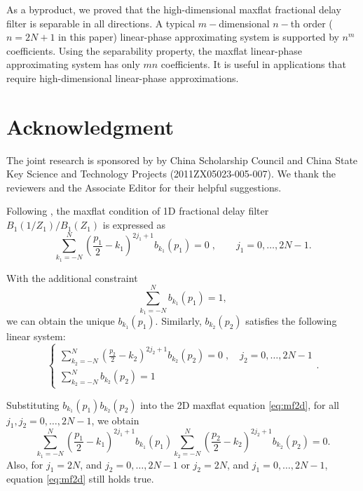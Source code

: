 As a byproduct, 
we proved that the high-dimensional maxflat fractional delay filter 
is separable in all directions.
A typical $m-$dimensional $n-$th order 
($n=2N+1$ in this paper) linear-phase 
approximating system is supported by $n^m$ coefficients.
Using the separability property,
the maxflat linear-phase
approximating system has only $mn$ coefficients.
It is useful in applications that require 
high-dimensional linear-phase approximations.

\section*{Acknowledgment}
The joint research is sponsored by by China Scholarship Council and
China State Key Science and Technology Projects (2011ZX05023-005-007).
We thank the reviewers and the Associate Editor for
their helpful suggestions.


Following \cite{thiran1971recursive}, 
the maxflat condition of 1D fractional delay
filter $B_1(1/Z_1)/B_1(Z_1)$ is expressed as
\begin{equation}
\sum_{k_1=-N}^N(\frac{p_1}{2}-k_1)^{2j_1+1}b_{k_1}(p_1)=0\;,
\qquad j_1=0,\dots,2N-1.
\end{equation}

With the additional constraint \cite[]{chen:2012a}
\begin{equation}
\sum_{k_1=-N}^Nb_{k_1}(p_1)=1,
\end{equation}
we can obtain the unique $b_{k_1}(p_1)$.
Similarly, $b_{k_2}(p_2)$ satisfies 
the following linear system:
\begin{equation}
\left\{\begin{array}{l}
\displaystyle{\sum_{k_2=-N}^N(\frac{p_2}{2}-k_2)^{2j_2+1}b_{k_2}(p_2)=0}\;,
 \quad j_2=0,\dots,2N-1 \\
\displaystyle{\sum_{k_2=-N}^Nb_{k_2}(p_2)=1}
\end{array}\right..
\end{equation}

Substituting $b_{k_1}(p_1)b_{k_2}(p_2)$ into 
the 2D maxflat equation \ref{eq:mf2d}, for all
$j_1,j_2=0,\dots,2N-1$, we obtain
\begin{equation}
\sum_{k_1=-N}^N(\frac{p_1}{2}-k_1)^{2j_1+1}b_{k_1}(p_1)
\sum_{k_2=-N}^N(\frac{p_2}{2}-k_2)^{2j_2+1}b_{k_2}(p_2)=0.
\end{equation}
Also, for
$j_1=2N$, and $j_2=0,\dots,2N-1$ 
or $j_2=2N$, and $j_1=0,\dots,2N-1$,
equation \ref{eq:mf2d} still holds true.

